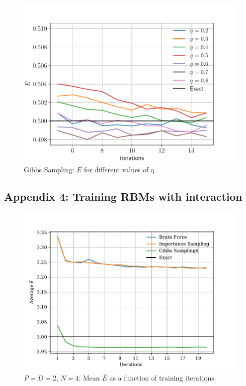 \documentclass[%
oneside,                 %
final,                   %
10pt]{article}
\begin{document}
\begin{appendices}
\begin{figure}[H]
        \centering 
         \includegraphics[scale=0.7]{../Results/sim_9/GS_eta.pdf} 
        \caption{Gibbs Sampling:  $\bar E$ for different values of $\eta$ }
        \label{fig:GS_eta}   
\end{figure}  

\subsection{Appendix 4: Training RBMs with interaction}
\begin{figure}[H]
        \centering 
         \includegraphics[scale=0.7]{../Results/sim_12/training_interacting.pdf} 
        \caption{$P=D=2$, $N=4$: Mean $\bar E$ as a function of training iterations.}
        \label{fig:interacting_n4_energy}   
\end{figure}  


\end{appendices}
\end{document}

